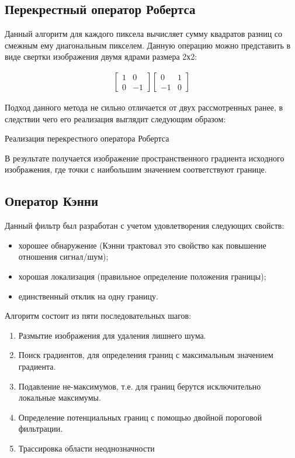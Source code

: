 \subsection{Перекрестный оператор Робертса}

Данный алгоритм\cite{Roberts} для каждого пиксела вычисляет сумму квадратов разниц со смежным ему диагональным пикселем. Данную операцию можно представить в виде свертки изображения двумя ядрами размера 2х2:

\begin{eqnarray}\label{eq:roberts-matrixs}
\begin{bmatrix}
1 & 0\\
0 & -1
\end{bmatrix} 
\begin{bmatrix}
0 & 1\\
-1 & 0
\end{bmatrix}
\end{eqnarray}

Подход данного метода не сильно отличается от двух рассмотренных ранее, в следствии чего его реализация выглядит следующим образом:

\begin{minipage}{0.75\textwidth}
	\begin{algorithm}[H]
		
		\caption{Реализация перекрестного оператора Робертса}
		\label{imp:roberts}
	\end{algorithm}
\end{minipage}


В результате получается изображение пространственного градиента исходного изображения, где точки с наибольшим значением соответствуют границе.

\subsection{Оператор Кэнни}

Данный фильтр\cite{Canny} был разработан с учетом удовлетворения следующих свойств:
\begin{itemize}
	\item хорошее обнаружение (Кэнни трактовал это свойство как повышение отношения сигнал/шум);
	\item хорошая локализация (правильное определение положения границы);
	\item единственный отклик на одну границу.
\end{itemize}

Алгоритм состоит из пяти последовательных шагов:
\begin{enumerate}
	\item Размытие изображения для удаления лишнего шума.
	\item Поиск градиентов, для определения границ с максимальным значением градиента.
	\item Подавление не-максимумов, т.е. для границ берутся исключительно локальные максимумы.
	\item Определение потенциальных границ с помощью двойной пороговой фильтрации.
	\item Трассировка области неоднозначности
\end{enumerate}

